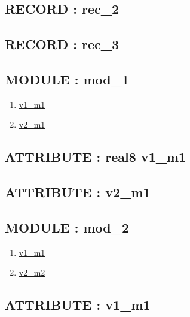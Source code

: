 \subsection*{RECORD : rec\_2}
\hypertarget{ecldoc:intest.in1intest.example_2_intest.in1intest.example_2.rec_2}{}
\subsection*{RECORD : rec\_3}
\hypertarget{ecldoc:intest.in1intest.example_2_intest.in1intest.example_2.rec_3}{}
\subsection*{MODULE : mod\_1}
\hypertarget{ecldoc:intest.in1intest.example_2_intest.in1intest.example_2.mod_1}{}
\begin{enumerate}
\item \hyperlink{ecldoc:intest.in1intest.example_2_intest.in1intest.example_2.mod_1.v1_m1}{v1\_m1}
\item \hyperlink{ecldoc:intest.in1intest.example_2_intest.in1intest.example_2.mod_1.v2_m1}{v2\_m1}
\end{enumerate}
\subsection*{ATTRIBUTE : real8 v1\_m1}
\hypertarget{ecldoc:intest.in1intest.example_2_intest.in1intest.example_2.mod_1.v1_m1}{}
\subsection*{ATTRIBUTE : v2\_m1}
\hypertarget{ecldoc:intest.in1intest.example_2_intest.in1intest.example_2.mod_1.v2_m1}{}

\subsection*{MODULE : mod\_2}
\hypertarget{ecldoc:intest.in1intest.example_2_intest.in1intest.example_2.mod_2}{}
\begin{enumerate}
\item \hyperlink{ecldoc:intest.in1intest.example_2_intest.in1intest.example_2.mod_2.v1_m1}{v1\_m1}
\item \hyperlink{ecldoc:intest.in1intest.example_2_intest.in1intest.example_2.mod_2.v2_m2}{v2\_m2}
\end{enumerate}
\subsection*{ATTRIBUTE : v1\_m1}
\hypertarget{ecldoc:intest.in1intest.example_2_intest.in1intest.example_2.mod_2.v1_m1}{}
